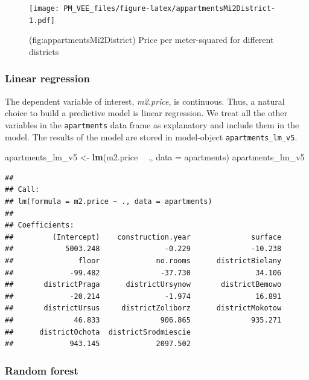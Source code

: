 \documentclass[12pt,]{krantz}
\newenvironment{Shaded}{\begin{snugshade}}{\end{snugshade}}
\newcommand{\DataTypeTok}[1]{\textcolor[rgb]{0.13,0.29,0.53}{#1}}
\newcommand{\KeywordTok}[1]{\textcolor[rgb]{0.13,0.29,0.53}{\textbf{#1}}}
\newcommand{\NormalTok}[1]{#1}
\newcommand{\OperatorTok}[1]{\textcolor[rgb]{0.81,0.36,0.00}{\textbf{#1}}}
\newcommand{\StringTok}[1]{\textcolor[rgb]{0.31,0.60,0.02}{#1}}
\theoremstyle{definition}
\theoremstyle{definition}
\theoremstyle{definition}
\theoremstyle{remark}
\begin{document}
\begin{figure}
\centering
\texttt{[image: PM\_VEE\_files/figure-latex/appartmentsMi2District-1.pdf]}
\caption{\label{fig:appartmentsMi2District}(fig:appartmentsMi2District)
Price per meter-squared for different districts}
\end{figure}

\hypertarget{model-Apartments-lr}{%
\subsubsection{Linear regression}\label{model-Apartments-lr}}

The dependent variable of interest, \emph{m2.price}, is continuous.
Thus, a natural choice to build a predictive model is linear regression.
We treat all the other variables in the \texttt{apartments} data frame
as explanatory and include them in the model. The results of the model
are stored in model-object \texttt{apartments\_lm\_v5}.

\begin{Shaded}
\begin{Highlighting}[]
\NormalTok{apartments_lm_v5 <-}\StringTok{ }\KeywordTok{lm}\NormalTok{(m2.price }\OperatorTok{~}\StringTok{ }\NormalTok{., }\DataTypeTok{data =}\NormalTok{ apartments)}
\NormalTok{apartments_lm_v5}
\end{Highlighting}
\end{Shaded}

\begin{verbatim}
## 
## Call:
## lm(formula = m2.price ~ ., data = apartments)
## 
## Coefficients:
##         (Intercept)    construction.year              surface  
##            5003.248               -0.229              -10.238  
##               floor             no.rooms      districtBielany  
##             -99.482              -37.730               34.106  
##       districtPraga      districtUrsynow       districtBemowo  
##             -20.214               -1.974               16.891  
##       districtUrsus     districtZoliborz      districtMokotow  
##              46.833              906.865              935.271  
##      districtOchota  districtSrodmiescie  
##             943.145             2097.502
\end{verbatim}

\hypertarget{model-Apartments-rf}{%
\subsubsection{Random forest}\label{model-Apartments-rf}}
\end{document}
